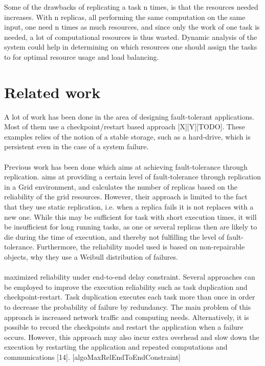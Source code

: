 \documentclass{cslthse-msc}
\begin{document}
Some of the drawbacks of replicating a task n times, is that the resources needed increases. With n replicas, all performing the same computation on the same input, one need n times as much resources, and since only the work of one task is needed, a lot of computational resources is thus wasted. Dynamic analysis of the system could help in determining on which resources one should assign the tasks to for optimal resource usage and load balancing.


\section{Related work} \label{sec:related_work}
A lot of work has been done in the area of designing fault-tolerant applications. Most of them use a checkpoint/restart based approach [X][Y][TODO]. These examples relies of the notion of a stable storage, such as a hard-drive, which is persistent even in the case of a system failure. 
\\\\
Previous work has been done which aims at achieving fault-tolerance through replication. \cite{effTaskReplMobGrid} aims at providing a certain level of fault-tolerance through replication in a Grid environment, and calculates the number of replicas based on the reliability of the grid resources. However, their approach is limited to the fact that they use static replication, i.e. when a replica fails it is not replaces with a new one. While this may be sufficient for task with short execution times, it will be insufficient for long running tasks, as one or several replicas then are likely to die during the time of execution, and thereby not fulfilling the level of fault-tolerance. Furthermore, the reliability model used is based on non-repairable objects, why they use a Weibull distribution of failures.
\\\\
maximized reliability under end-to-end delay constraint.
Several approaches can be employed to improve the execution reliability such as task duplication and checkpoint-restart. Task duplication executes each task more than once in order to decrease the probability of failure by redundancy. The main problem of this approach is increased network traffic and computing needs. Alternatively, it is possible to record the checkpoints and restart the application when a failure occurs. However, this approach may also incur extra overhead and slow down the execution by restarting the application and repeated computations and communications [14]. [algoMaxRelEndToEndConstraint]
\end{document}
